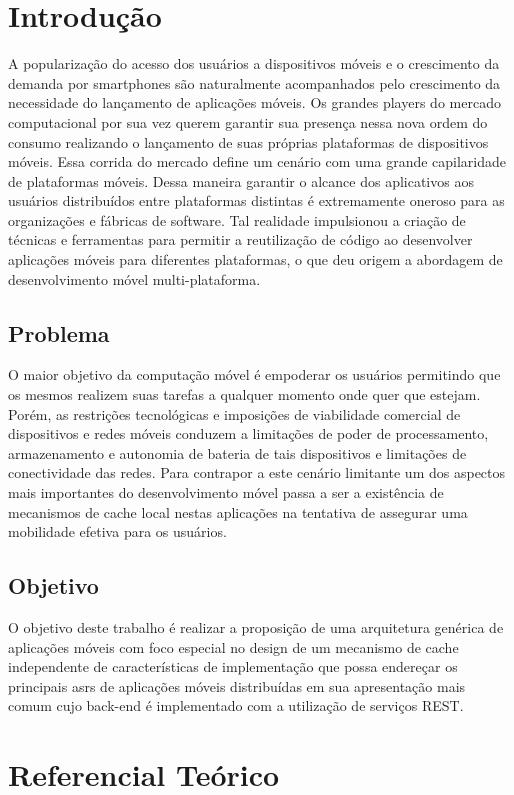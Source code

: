 \documentclass[
	article,			%
	11pt,				%
	oneside,			%
	a4paper,			%
	english,			%
	brazil,				%
	sumario=tradicional
]{abntex2}
\begin{document}
\chapter{Introdução}
A popularização do acesso dos usuários a dispositivos móveis e o crescimento da demanda por smartphones são naturalmente acompanhados pelo crescimento da necessidade do lançamento de aplicações móveis.
Os grandes players do mercado computacional por sua vez querem garantir sua presença nessa nova ordem do consumo realizando o lançamento de suas próprias plataformas de dispositivos móveis.
Essa corrida do mercado define um cenário com uma grande capilaridade de plataformas móveis. Dessa maneira garantir o alcance dos aplicativos aos usuários distribuídos entre plataformas distintas é extremamente oneroso para as organizações e fábricas de software.
Tal realidade impulsionou a criação de técnicas e ferramentas para permitir a reutilização de código ao desenvolver aplicações móveis para diferentes plataformas, o que deu origem a abordagem de desenvolvimento móvel multi-plataforma.

\section{Problema}
O maior objetivo da computação móvel é empoderar os usuários permitindo que os mesmos realizem suas tarefas a qualquer momento onde quer que estejam.
Porém, as restrições tecnológicas e imposições de viabilidade comercial de dispositivos e redes móveis conduzem a limitações de poder de processamento,  armazenamento e autonomia de bateria de tais dispositivos e limitações de conectividade das redes.
Para contrapor a este cenário limitante um dos aspectos mais importantes do desenvolvimento móvel passa a ser a existência de mecanismos de cache local nestas aplicações na tentativa de assegurar uma mobilidade efetiva para os usuários.

\section{Objetivo}
O objetivo deste trabalho é realizar a proposição de uma arquitetura genérica de aplicações móveis com foco especial no design de um mecanismo de cache independente de características de implementação que possa endereçar os principais \glspl{asr} de aplicações móveis distribuídas em sua apresentação mais comum cujo \gls{back-end} é implementado com a utilização de serviços REST.

\chapter{Referencial Teórico}
\end{document}
